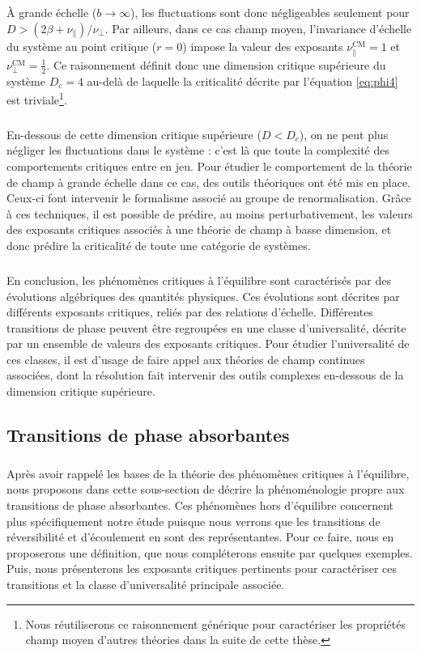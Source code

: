 \noindent \`A grande échelle ($b\rightarrow\infty$), les fluctuations sont donc négligeables seulement pour $D > (2\beta+\nu_\parallel)/\nu_\perp$. Par ailleurs, dans ce cas champ moyen, l'invariance d'échelle du système au point critique ($r=0$) impose la valeur des exposants $\nu_\parallel^\text{CM} = 1$ et $\nu_\perp^\text{CM} = \frac{1}{2}$. Ce raisonnement définit donc une dimension critique supérieure du système $D_c = 4$ au-delà de laquelle la criticalité décrite par l'équation \autoref{eq:phi4} est triviale\footnote{Nous réutiliserons ce raisonnement générique pour caractériser les propriétés champ moyen d'autres théories dans la suite de cette thèse.}. 

\subparagraph{}En-dessous de cette dimension critique supérieure ($D<D_c$), on ne peut plus négliger les fluctuations dans le système : c'est là que toute la complexité des comportements critiques entre en jeu. Pour étudier le comportement de la théorie de champ à grande échelle dans ce cas, des outils théoriques ont été mis en place. Ceux-ci font intervenir le formalisme associé au groupe de renormalisation. Grâce à ces techniques, il est possible de prédire, au moins perturbativement, les valeurs des exposants critiques associés à une théorie de champ à basse dimension, et donc prédire la criticalité de toute une catégorie de systèmes.

\subparagraph{}En conclusion, les phénomènes critiques à l'équilibre sont caractérisés par des évolutions algébriques des quantités physiques. Ces évolutions sont décrites par différents exposants critiques, reliés par des relations d'échelle. Différentes transitions de phase peuvent être regroupées en une classe d'universalité, décrite par un ensemble de valeurs des exposants critiques. Pour étudier l'universalité de ces classes, il est d'usage de faire appel aux théories de champ continues associées, dont la résolution fait intervenir des outils complexes en-dessous de la dimension critique supérieure.

\subsection{Transitions de phase absorbantes}

\subparagraph{}Après avoir rappelé les bases de la théorie des phénomènes critiques à l'équilibre, nous proposons dans cette sous-section de décrire la phénoménologie propre aux transitions de phase absorbantes. Ces phénomènes hors d'équilibre concernent plus spécifiquement notre étude puisque nous verrons que les transitions de réversibilité et d'écoulement en sont des représentantes. Pour ce faire, nous en proposerons une définition, que nous compléterons ensuite par quelques exemples. Puis, nous présenterons les exposants critiques pertinents pour caractériser ces transitions et la classe d'universalité principale associée.

